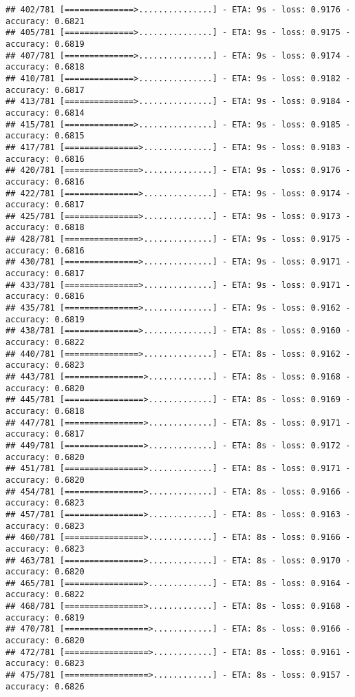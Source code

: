 \documentclass[
]{article}
\begin{document}
\begin{verbatim}
## 402/781 [==============>...............] - ETA: 9s - loss: 0.9176 - accuracy: 0.6821 
## 405/781 [==============>...............] - ETA: 9s - loss: 0.9175 - accuracy: 0.6819
## 407/781 [==============>...............] - ETA: 9s - loss: 0.9174 - accuracy: 0.6818
## 410/781 [==============>...............] - ETA: 9s - loss: 0.9182 - accuracy: 0.6817
## 413/781 [==============>...............] - ETA: 9s - loss: 0.9184 - accuracy: 0.6814
## 415/781 [==============>...............] - ETA: 9s - loss: 0.9185 - accuracy: 0.6815
## 417/781 [===============>..............] - ETA: 9s - loss: 0.9183 - accuracy: 0.6816
## 420/781 [===============>..............] - ETA: 9s - loss: 0.9176 - accuracy: 0.6816
## 422/781 [===============>..............] - ETA: 9s - loss: 0.9174 - accuracy: 0.6817
## 425/781 [===============>..............] - ETA: 9s - loss: 0.9173 - accuracy: 0.6818
## 428/781 [===============>..............] - ETA: 9s - loss: 0.9175 - accuracy: 0.6816
## 430/781 [===============>..............] - ETA: 9s - loss: 0.9171 - accuracy: 0.6817
## 433/781 [===============>..............] - ETA: 9s - loss: 0.9171 - accuracy: 0.6816
## 435/781 [===============>..............] - ETA: 9s - loss: 0.9162 - accuracy: 0.6819
## 438/781 [===============>..............] - ETA: 8s - loss: 0.9160 - accuracy: 0.6822
## 440/781 [===============>..............] - ETA: 8s - loss: 0.9162 - accuracy: 0.6823
## 443/781 [================>.............] - ETA: 8s - loss: 0.9168 - accuracy: 0.6820
## 445/781 [================>.............] - ETA: 8s - loss: 0.9169 - accuracy: 0.6818
## 447/781 [================>.............] - ETA: 8s - loss: 0.9171 - accuracy: 0.6817
## 449/781 [================>.............] - ETA: 8s - loss: 0.9172 - accuracy: 0.6820
## 451/781 [================>.............] - ETA: 8s - loss: 0.9171 - accuracy: 0.6820
## 454/781 [================>.............] - ETA: 8s - loss: 0.9166 - accuracy: 0.6823
## 457/781 [================>.............] - ETA: 8s - loss: 0.9163 - accuracy: 0.6823
## 460/781 [================>.............] - ETA: 8s - loss: 0.9166 - accuracy: 0.6823
## 463/781 [================>.............] - ETA: 8s - loss: 0.9170 - accuracy: 0.6820
## 465/781 [================>.............] - ETA: 8s - loss: 0.9164 - accuracy: 0.6822
## 468/781 [================>.............] - ETA: 8s - loss: 0.9168 - accuracy: 0.6819
## 470/781 [=================>............] - ETA: 8s - loss: 0.9166 - accuracy: 0.6820
## 472/781 [=================>............] - ETA: 8s - loss: 0.9161 - accuracy: 0.6823
## 475/781 [=================>............] - ETA: 8s - loss: 0.9157 - accuracy: 0.6826

\end{verbatim}
\end{document}
